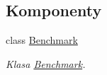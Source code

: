 \subsection*{Komponenty}
\begin{DoxyCompactItemize}
\item 
class \hyperlink{class_benchmark}{Benchmark}
\begin{DoxyCompactList}\small\item\em Klasa \hyperlink{class_benchmark}{Benchmark}. \end{DoxyCompactList}\end{DoxyCompactItemize}

